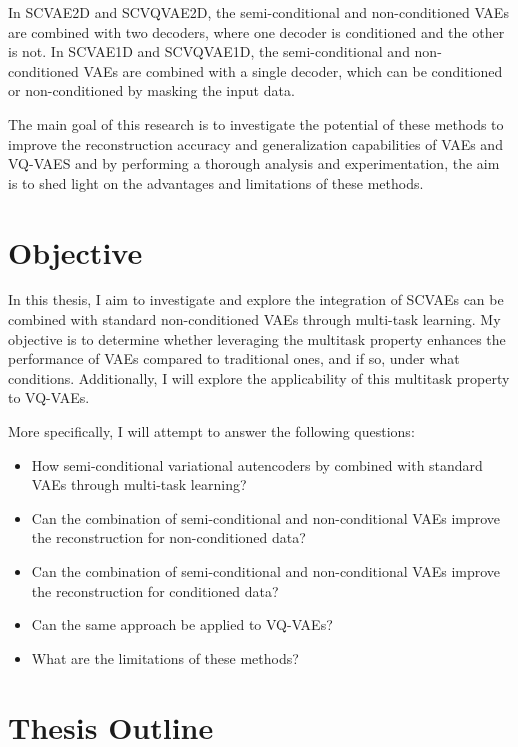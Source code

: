 In SCVAE2D and SCVQVAE2D, the semi-conditional and non-conditioned VAEs are combined with two decoders, where one decoder is conditioned and the other is not. In SCVAE1D and SCVQVAE1D, the semi-conditional and non-conditioned VAEs are combined with a single decoder, which can be conditioned or non-conditioned by masking the input data.

The main goal of this research is to investigate the potential of these methods to improve the reconstruction accuracy and generalization capabilities of VAEs and VQ-VAES and by performing a thorough analysis and experimentation, the aim is to shed light on the advantages and limitations of these methods.

\section{Objective}

In this thesis, I aim to investigate and explore the integration of SCVAEs can be combined with standard non-conditioned VAEs through multi-task learning. My objective is to determine whether leveraging the multitask property enhances the performance of VAEs compared to traditional ones, and if so, under what conditions. Additionally, I will explore the applicability of this multitask property to VQ-VAEs.

More specifically, I will attempt to answer the following questions:

\begin{itemize}
    \item How semi-conditional variational autencoders by combined with standard VAEs through multi-task learning?
    \item Can the combination of semi-conditional and non-conditional VAEs improve the reconstruction for non-conditioned data?
    \item Can the combination of semi-conditional and non-conditional VAEs improve the reconstruction for conditioned data?
    \item Can the same approach be applied to VQ-VAEs?
    \item What are the limitations of these methods?
\end{itemize}



\section{Thesis Outline}



